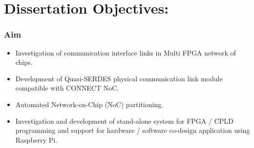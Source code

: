 
\section{Dissertation Objectives:}
\begin {frame}
\frametitle {Aim}
\begin {center}
\begin{itemize} 
	\item{Investigation of communication interface links in Multi FPGA network of chips.}
	\item{Development of Quasi-SERDES physical communication link module compatible with CONNECT NoC.}
	\item{Automated Network-on-Chip (NoC) partitioning.}
	\item{Investigation and development of stand-alone system for FPGA / CPLD programming and support for hardware /  software co-design application using Raspberry Pi.}
\end{itemize}
\end {center}
\end {frame}